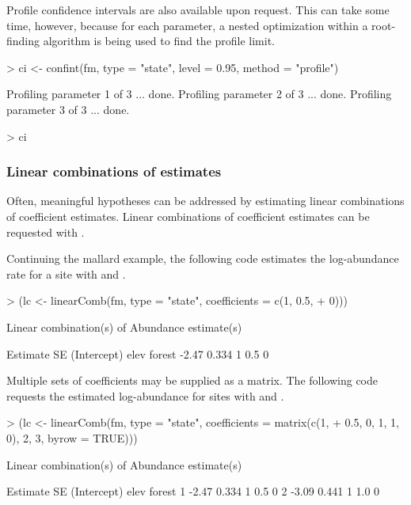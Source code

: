 \documentclass[article,shortnames]{jss}
\begin{document}
Profile confidence intervals are also available upon request.  This
can take some time, however, because for each parameter, a nested
optimization within a root-finding algorithm is being used to find the
profile limit.

\begin{Schunk}
\begin{Sinput}
> ci <- confint(fm, type = "state", level = 0.95, method = "profile")
\end{Sinput}
\begin{Soutput}
Profiling parameter 1 of 3 ... done.
Profiling parameter 2 of 3 ... done.
Profiling parameter 3 of 3 ... done.
\end{Soutput}
\begin{Sinput}
> ci
\end{Sinput}
\end{Schunk}

\subsubsection{Linear combinations of estimates}

Often, meaningful hypotheses can be addressed by estimating linear
combinations of coefficient estimates.  Linear combinations of coefficient
estimates can be requested with .

Continuing the mallard example, the following code estimates the
log-abundance rate for a site with  and .

\begin{Schunk}
\begin{Sinput}
> (lc <- linearComb(fm, type = "state", coefficients = c(1, 0.5, 
+     0)))
\end{Sinput}
\begin{Soutput}
Linear combination(s) of Abundance estimate(s)

 Estimate    SE (Intercept) elev forest
    -2.47 0.334           1  0.5      0
\end{Soutput}
\end{Schunk}

Multiple sets of coefficients may be supplied as a matrix.  The
following code requests the estimated log-abundance for sites with
 and .

\begin{Schunk}
\begin{Sinput}
> (lc <- linearComb(fm, type = "state", coefficients = matrix(c(1, 
+     0.5, 0, 1, 1, 0), 2, 3, byrow = TRUE)))
\end{Sinput}
\begin{Soutput}
Linear combination(s) of Abundance estimate(s)

  Estimate    SE (Intercept) elev forest
1    -2.47 0.334           1  0.5      0
2    -3.09 0.441           1  1.0      0
\end{Soutput}
\end{Schunk}
\end{document}
